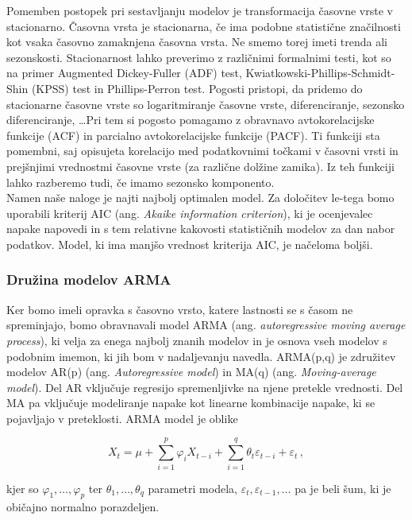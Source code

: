 \documentclass[a4paper, 11pt]{article}
\begin{document}
\noindent Pomemben postopek pri sestavljanju modelov je transformacija časovne vrste v stacionarno.
Časovna vrsta je stacionarna, če ima podobne statistične značilnosti kot vsaka časovno zamaknjena časovna vrsta. 
Ne smemo torej imeti trenda ali sezonskosti.
Stacionarnost lahko preverimo z različnimi formalnimi testi, kot so na primer Augmented Dickey-Fuller (ADF) test,
Kwiatkowski-Phillips-Schmidt-Shin (KPSS) test in Phillips-Perron test.
Pogosti pristopi, da pridemo do stacionarne časovne vrste so logaritmiranje časovne vrste, diferenciranje,
sezonsko diferenciranje, \dots Pri tem si pogosto pomagamo z obravnavo 
avtokorelacijske funkcije (ACF) in parcialno avtokorelacijske funkcije (PACF). 
Ti funkciji sta pomembni, saj opisujeta korelacijo med podatkovnimi točkami v časovni vrsti in prejšnjimi vrednostmi 
časovne vrste (za različne dolžine zamika). Iz teh funkciji lahko razberemo tudi, če imamo sezonsko komponento.
\cite{Stacionarity_V,Brilej_2021} \\

\noindent Namen naše naloge je najti najbolj optimalen model. Za določitev le-tega bomo uporabili kriterij AIC (ang. \emph{Akaike information criterion}),
ki je ocenjevalec napake napovedi in s tem relativne kakovosti statističnih modelov za dan nabor podatkov.
Model, ki ima manjšo vrednost kriterija AIC, je načeloma boljši. 

\subsubsection{Družina modelov ARMA}

\noindent Ker bomo imeli opravka s časovno vrsto, katere lastnosti se s časom ne spreminjajo, bomo
obravnavali model ARMA (ang. \emph{autoregressive moving average process}), ki velja za enega najbolj znanih modelov 
in je osnova vseh modelov s podobnim imemon, ki jih bom v nadaljevanju navedla. 
ARMA(p,q) je združitev modelov AR(p) (ang. \emph{Autoregressive model}) in MA(q) (ang. \emph{Moving-average model}). 
Del AR vključuje regresijo spremenljivke na njene pretekle vrednosti. 
Del MA pa vključuje modeliranje napake kot linearne kombinacije napake, ki se pojavljajo v preteklosti.
ARMA model je oblike

\begin{equation}
    \label{ARIMA}
    X_t = \mu +  \sum_{i=1}^{p}{\varphi_i X_{t-i}} + \sum_{i=1}^{q}{\theta_t \varepsilon_{t-i}} + \varepsilon_t \,,
\end{equation}

\noindent kjer so $\varphi_1, \dots, \varphi_p$ ter $\theta_1, \dots, \theta_q$ parametri
modela, $\varepsilon_t, \varepsilon_{t-1}, \dots$ pa je beli šum, ki je običajno
normalno porazdeljen. \\
\end{document}
